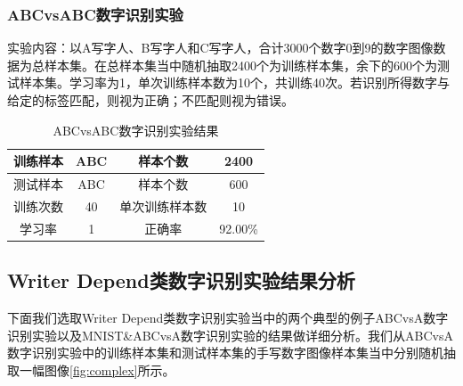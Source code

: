 \subsubsection{ABCvsABC数字识别实验}
实验内容：以A写字人、B写字人和C写字人，合计3000个数字0到9的数字图像数据为总样本集。在总样本集当中随机抽取2400个为训练样本集，余下的600个为测试样本集。学习率为1，单次训练样本数为10个，共训练40次。若识别所得数字与给定的标签匹配，则视为正确；不匹配则视为错误。
\begin{table}[htbp]
    \centering
    \caption{ABCvsABC数字识别实验结果}
    \label{tab:2}
    \begin{tabular}{@{}cccc@{}}
        \toprule
        训练样本 & ABC & 样本个数    & 2400    \\ \midrule
        测试样本 & ABC & 样本个数    & 600     \\
        训练次数 & 40  & 单次训练样本数 & 10      \\
        学习率  & 1   & 正确率     & 92.00\% \\ \bottomrule
    \end{tabular}
\end{table}
\subsection{Writer Depend类数字识别实验结果分析}

下面我们选取Writer Depend类数字识别实验当中的两个典型的例子ABCvsA数字识别实验以及MNIST\&ABCvsA数字识别实验的结果做详细分析。我们从ABCvsA数字识别实验中的训练样本集和测试样本集的手写数字图像样本集当中分别随机抽取一幅图像\ref{fig:complex}所示。

